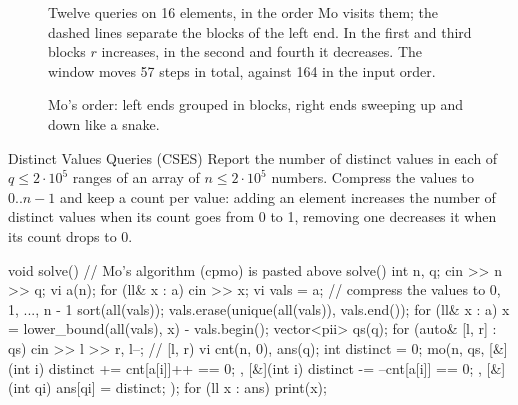 \begin{figure}[htbp]
\centering
{}
\hspace{4mm}
\begin{minipage}[b]{5.0cm}\sffamily\footnotesize\color{fgink!80}\raggedright
Twelve queries on 16 elements, in the order Mo visits them; the dashed lines separate the blocks of the left end. In the first
and third blocks $r$ increases, in the second and fourth it decreases. The window moves 57 steps in total, against 164 in the
input order.\par\vspace{1.2cm}
\end{minipage}
\caption{Mo's order: left ends grouped in blocks, right ends sweeping up and down like a snake.}
\label{fig:mo}
\end{figure}

\begin{problem}{Distinct Values Queries (CSES)}
Report the number of distinct values in each of $q \le 2 \cdot 10^5$ ranges of an array of $n \le 2 \cdot 10^5$ numbers.
\solution Compress the values to $0..n-1$ and keep a count per value: adding an element increases the number of distinct values when
its count goes from 0 to 1, removing one decreases it when its count drops to 0.
\end{problem}

\begin{code}
void solve() {  // Mo's algorithm (cpmo) is pasted above solve()
    int n, q;
    cin >> n >> q;
    vi a(n);
    for (ll& x : a) cin >> x;
    vi vals = a;  // compress the values to 0, 1, ..., n - 1
    sort(all(vals));
    vals.erase(unique(all(vals)), vals.end());
    for (ll& x : a) x = lower_bound(all(vals), x) - vals.begin();
    vector<pii> qs(q);
    for (auto& [l, r] : qs) cin >> l >> r, l--;  // [l, r)
    vi cnt(n, 0), ans(q);
    int distinct = 0;
    mo(n, qs, [&](int i) { distinct += cnt[a[i]]++ == 0; },
       [&](int i) { distinct -= --cnt[a[i]] == 0; },
       [&](int qi) { ans[qi] = distinct; });
    for (ll x : ans) print(x);
}
\end{code}

